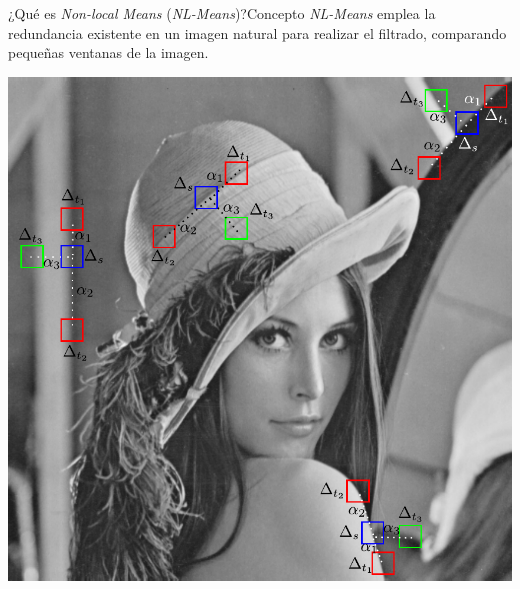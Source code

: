 \documentclass[fleqn,10pt]{beamer}
\begin{document}
\begin{frame}{¿Qué es \emph{Non-local Means} (\emph{NL-Means})?}{Concepto}
	\emph{NL-Means} emplea la redundancia existente en un imagen natural para realizar el filtrado, comparando pequeñas ventanas de la imagen.
	\begin{center}
		\includegraphics[width=0.6\linewidth]{AAUgraphics/pt3/lennaPatches}
	\end{center}
\end{frame}
\end{document}
